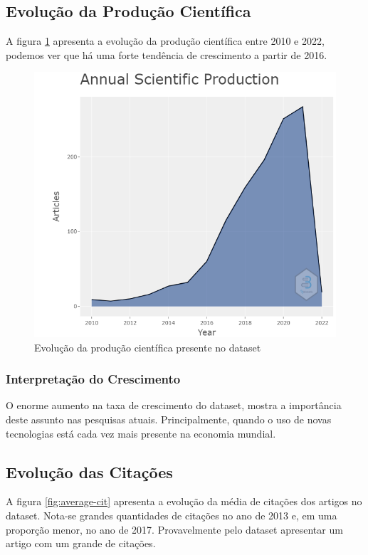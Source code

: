 \begin{description}
\end{description}

     
\subsection{Evolução da Produção Científica}
A figura \ref{fig:ev-s-p} apresenta a evolução da produção científica entre 2010 e 2022, podemos ver que há uma forte tendência de crescimento a partir de 2016.

\begin{figure}[ht]
    \centering
    \includegraphics[width=12cm]{experiments/Tong00020/PesquisaBibliometrica/DataSet/MASSA@Tong00020-Annual Scientific Production.png}
    \caption{Evolução da produção científica presente no dataset}
    \label{fig:ev-s-p}
\end{figure}

     
\subsubsection{Interpretação do Crescimento}

O enorme aumento na taxa de crescimento do dataset, mostra a importância deste assunto nas pesquisas atuais. Principalmente, quando o uso de novas tecnologias está cada vez mais presente na economia mundial.

\subsection{Evolução das Citações}
A figura \ref{fig:average-cit} apresenta a evolução da média de citações dos artigos no dataset. Nota-se grandes quantidades de citações no ano de 2013 e, em uma proporção menor, no ano de 2017. Provavelmente pelo dataset apresentar um artigo com um grande de citações.


